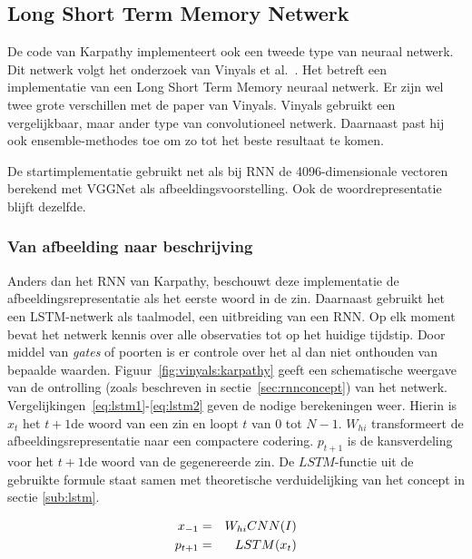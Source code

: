 \subsection{Long Short Term Memory Netwerk}
\label{sec:lstm}
De code van Karpathy implementeert ook een tweede type van neuraal netwerk. Dit netwerk volgt het onderzoek van Vinyals et al.~\cite{Google}. Het betreft een implementatie van een Long Short Term Memory neuraal netwerk. Er zijn wel twee grote verschillen met de paper van Vinyals. Vinyals gebruikt een vergelijkbaar, maar ander type van convolutioneel netwerk. Daarnaast past hij ook ensemble-methodes toe om zo tot het beste resultaat te komen.

De startimplementatie gebruikt net als bij RNN de 4096-dimensionale vectoren berekend met VGGNet als afbeeldingsvoorstelling. Ook de woordrepresentatie blijft dezelfde.

\subsubsection{Van afbeelding naar beschrijving}
Anders dan het RNN van Karpathy, beschouwt deze implementatie de afbeeldingsrepresentatie als het eerste woord in de zin. Daarnaast gebruikt het een LSTM-netwerk als taalmodel, een uitbreiding van een RNN. Op elk moment bevat het netwerk kennis over alle observaties tot op het huidige tijdstip. Door middel van \emph{gates} of poorten is er controle over het al dan niet onthouden van bepaalde waarden. Figuur~\ref{fig:vinyals:karpathy} geeft een schematische weergave van de ontrolling (zoals beschreven in sectie~\ref{sec:rnnconcept}) van het netwerk. Vergelijkingen~\eqref{eq:lstm1}-\eqref{eq:lstm2} geven de nodige berekeningen weer. Hierin is $x_t$ het $t+1$de woord van een zin en loopt $t$ van $0$ tot $N-1$. $W_{hi}$ transformeert de afbeeldingsrepresentatie naar een compactere codering. $p_{t+1}$ is de kansverdeling voor het $t+1$de woord van de gegenereerde zin. De $LSTM$-functie uit de gebruikte formule staat samen met theoretische verduidelijking van het concept in sectie \ref{sub:lstm}. 

\begin{eqnarray}
\vspace{-3mm}
\label{eq:lstm1}
x_{-1} & = & W_{hi}CNN(I)\\
p_{t+1} & = & LSTM(x_t)
\label{eq:lstm2}
\end{eqnarray}

